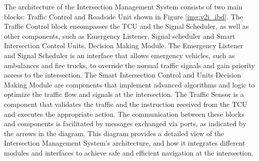 The architecture of the Intersection Management System consists of two main blocks: Traffic Control and Roadside Unit shown in Figure \ref{img:v2i_ibd}. The Traffic Control block encompasses the TCU and the Signal Scheduler, as well as other components, such as Emergency Listener, Signal scheduler and Smart Intersection Control Units, Decision Making Module. The Emergency Listener and  Signal Scheduler is an interface that allows emergency vehicles, such as ambulances and fire trucks, to override the normal traffic signals and gain priority access to the intersection. The Smart Intersection Control and Units Decision Making Module are components that implement advanced algorithms and logic to optimize the traffic flow and signals at the intersection. The Traffic Sensor is a component that validates the traffic and the instruction received from the TCU and executes the appropriate action. The communication between these blocks and components is facilitated by messages exchanged via ports, as indicated by the arrows in the diagram. This diagram provides a detailed view of the Intersection Management System’s architecture, and how it integrates different modules and interfaces to achieve safe and efficient navigation at the intersection.


